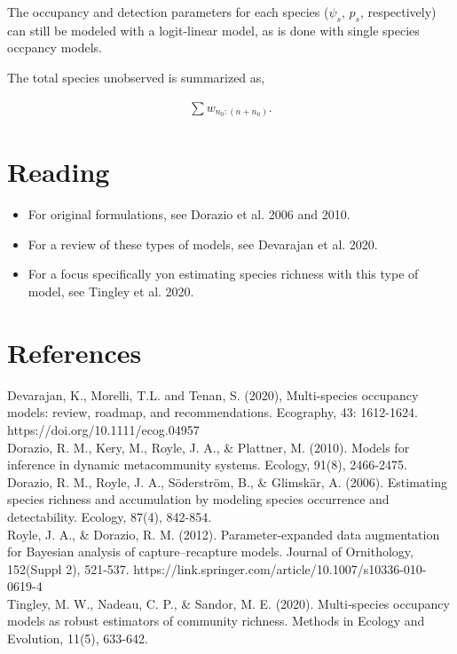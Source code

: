 \documentclass[12pt]{article}
\begin{document}
The occupancy and detection parameters for each species ($\psi_{s}$, $p_{s}$, respectively) can still be modeled with a logit-linear model, as is done with single species occpancy models. 

The total species unobserved is summarized as,

\begin{align*}
\sum w_{n_{0} : (n+n_{0})}.
\end{align*}

\section*{Reading}

\begin{itemize}

\item For original formulations, see Dorazio et al. 2006 and 2010.\\

\item For a review of these types of models, see Devarajan et al. 2020.\\

\item For a focus specifically yon estimating species richness with this type of model, see Tingley et al. 2020.\\

\end{itemize}

\section*{References}

\indent \indent Devarajan, K., Morelli, T.L. and Tenan, S. (2020), Multi-species occupancy models: review, roadmap, and recommendations. Ecography, 43: 1612-1624. https://doi.org/10.1111/ecog.04957\\

Dorazio, R. M., Kery, M., Royle, J. A., \& Plattner, M. (2010). Models for inference in dynamic metacommunity systems. Ecology, 91(8), 2466-2475.\\

Dorazio, R. M., Royle, J. A., Söderström, B., \& Glimskär, A. (2006). Estimating species richness and accumulation by modeling species occurrence and detectability. Ecology, 87(4), 842-854.\\

Royle, J. A., \& Dorazio, R. M. (2012). Parameter-expanded data augmentation for Bayesian analysis of capture–recapture models. Journal of Ornithology, 152(Suppl 2), 521-537. https://link.springer.com/article/10.1007/s10336-010-0619-4\\

Tingley, M. W., Nadeau, C. P., \& Sandor, M. E. (2020). Multi‐species occupancy models as robust estimators of community richness. Methods in Ecology and Evolution, 11(5), 633-642.\\
\end{document}
